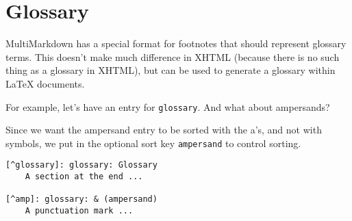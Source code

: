 
\def\mytitle{MultiMarkdown Glossary Test}

\part{Glossary}
\label{glossary}

MultiMarkdown has a special format for footnotes that should represent
glossary terms. This doesn't make much difference in XHTML (because there is
no such thing as a glossary in XHTML), but can be used to generate a glossary
within LaTeX documents.

For example, let's have an entry for \texttt{glossary}. And what about
ampersands?\glsadd{& }

Since we want the ampersand entry to be sorted with the a's, and not with
symbols, we put in the optional sort key \texttt{ampersand} to control sorting.

\begin{verbatim}
[^glossary]: glossary: Glossary 
    A section at the end ...

[^amp]: glossary: & (ampersand)
    A punctuation mark ...
\end{verbatim}






